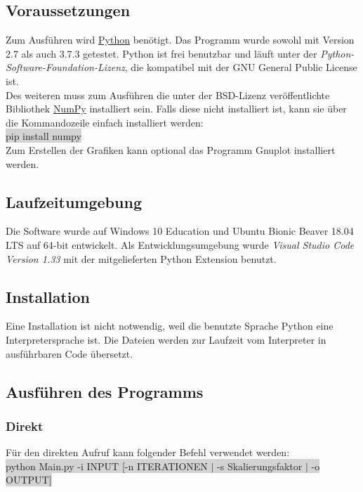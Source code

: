 \documentclass[a4paper,11pt]{article}
\begin{document}
{\subsection{Voraussetzungen}
Zum Ausf\"uhren wird \href{https://www.python.org/}{Python} ben\"otigt. Das Programm wurde sowohl mit Version 2.7 als auch 3.7.3 getestet. Python ist frei benutzbar und l\"auft unter der
\textit{Python-Software-Foundation-Lizenz}, die kompatibel mit der GNU General Public License ist.\\
Des weiteren muss zum Ausf\"uhren die unter der BSD-Lizenz ver\"offentlichte Bibliothek \href{https://www.numpy.org/}{NumPy} installiert sein.
Falls diese nicht installiert ist, kann sie \"uber die Kommandozeile einfach installiert werden:\\
\colorbox{lightgray}{pip install numpy}\\

Zum Erstellen der Grafiken kann optional das Programm Gnuplot installiert werden.

\subsection{Laufzeitumgebung}
Die Software wurde auf Windows 10 Education und Ubuntu Bionic Beaver 18.04 LTS auf 64-bit entwickelt. Als Entwicklungsumgebung wurde \textit{Visual Studio Code Version 1.33}
mit der mitgelieferten Python Extension benutzt. 

\subsection{Installation}

Eine Installation ist nicht notwendig, weil die benutzte Sprache Python eine Interpretersprache ist. Die Dateien werden zur Laufzeit vom Interpreter in ausf\"uhrbaren Code \"ubersetzt.


\subsection{Ausführen des Programms}
\subsubsection{Direkt}
F\"ur den direkten Aufruf kann folgender Befehl verwendet werden:\\
\colorbox{lightgray}{python Main.py -i INPUT [-n ITERATIONEN $|$ -s Skalierungsfaktor $|$ -o OUTPUT]}

}
\end{document}
